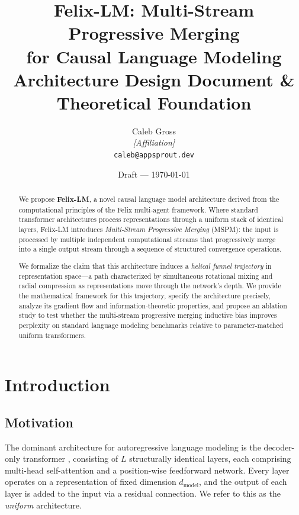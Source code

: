 \documentclass[11pt,a4paper]{article}
\title{%
  \textbf{Felix-LM: Multi-Stream Progressive Merging\\
  for Causal Language Modeling}\\[0.5em]
  \large Architecture Design Document \& Theoretical Foundation
}
\author{%
  Caleb Gross\\
  {\small\textit{[Affiliation]}}\\
  {\small\texttt{caleb@appsprout.dev}}
}
\date{Draft --- \today}
\theoremstyle{definition}
\theoremstyle{plain}
\theoremstyle{remark}
\begin{document}
\maketitle
\thispagestyle{fancy}

\begin{abstract}
We propose \textbf{Felix-LM}, a novel causal language model architecture 
derived from the computational principles of the Felix multi-agent 
framework. Where standard transformer architectures process representations 
through a uniform stack of identical layers, Felix-LM introduces 
\emph{Multi-Stream Progressive Merging} (MSPM): the input is processed by 
multiple independent computational streams that progressively merge into a 
single output stream through a sequence of structured convergence operations.

We formalize the claim that this architecture induces a \emph{helical funnel 
trajectory} in representation space---a path characterized by simultaneous 
rotational mixing and radial compression as representations move through the 
network's depth. We provide the mathematical framework for this trajectory, 
specify the architecture precisely, analyze its gradient flow and 
information-theoretic properties, and propose an ablation study to test 
whether the multi-stream progressive merging inductive bias improves 
perplexity on standard language modeling benchmarks relative to 
parameter-matched uniform transformers.
\end{abstract}

\tableofcontents
\newpage

\section{Introduction}\label{sec:intro}

\subsection{Motivation}

The dominant architecture for autoregressive language modeling is the 
decoder-only transformer \cite{vaswani2017attention, radford2019language}, 
consisting of $L$ structurally identical layers, each comprising multi-head 
self-attention and a position-wise feedforward network. Every layer operates 
on a representation of fixed dimension $d_{\text{model}}$, and the output of 
each layer is added to the input via a residual connection. We refer to this 
as the \emph{uniform} architecture.
\end{document}
